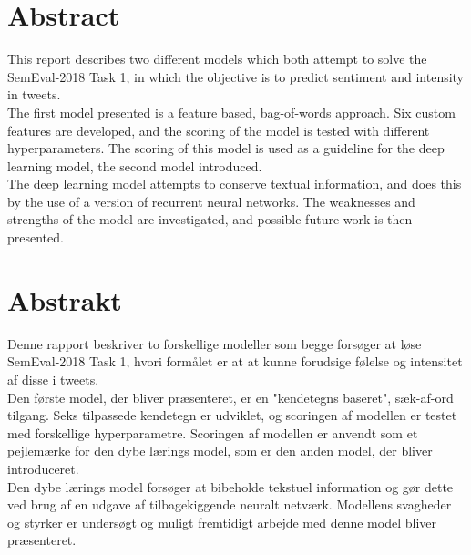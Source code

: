 
\section*{Abstract}
This report describes two different models which both attempt to solve the SemEval-2018 Task 1, in which the objective is to predict sentiment and intensity in tweets.\\
The first model presented is a feature based, bag-of-words approach. Six custom features are developed, and the scoring of the model is tested with different hyperparameters. The scoring of this model is used as a guideline for the deep learning model, the second model introduced.\\
The deep learning model attempts to conserve textual information, and does this by the use of a version of recurrent neural networks. The weaknesses and strengths of the model are investigated, and possible future work is then presented. 

\section*{Abstrakt}
Denne rapport beskriver to forskellige modeller som begge forsøger at løse SemEval-2018 Task 1, hvori formålet er at at kunne forudsige følelse og intensitet af disse i tweets.\\
Den første model, der bliver præsenteret, er en "kendetegns baseret", sæk-af-ord tilgang. Seks tilpassede kendetegn er udviklet, og scoringen af modellen er testet med forskellige hyperparametre. Scoringen af modellen er anvendt som et pejlemærke for den dybe lærings model, som er den anden model, der bliver introduceret.\\
Den dybe lærings model forsøger at bibeholde tekstuel information og gør dette ved brug af en udgave af tilbagekiggende neuralt netværk. Modellens svagheder og styrker er undersøgt og muligt fremtidigt arbejde med denne model bliver præsenteret.
